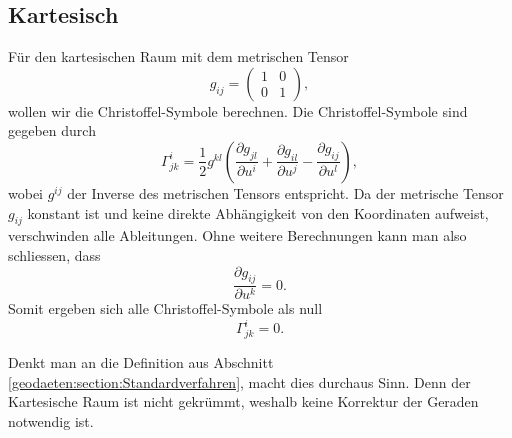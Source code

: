 %
%
%
%
\subsection{Kartesisch\label{geodaeten:section:Standardverfahren:Kartesisch}}

Für den kartesischen Raum mit dem metrischen Tensor
\begin{equation}
g_{ij} = \begin{pmatrix} 
	1 & 0 \\ 
	0 & 1 
\end{pmatrix},
\end{equation}
wollen wir die Christoffel-Symbole berechnen.
Die Christoffel-Symbole sind gegeben durch
\begin{equation}
\Gamma^i_{jk} = \frac{1}{2} g^{kl} \left( \frac{\partial g_{jl}}{\partial u^i} + \frac{\partial g_{il}}{\partial u^j} - \frac{\partial g_{ij}}{\partial u^l} \right),
\end{equation}
wobei $g^{ij}$ der Inverse des metrischen Tensors entspricht.
Da der metrische Tensor $g_{ij}$ konstant ist und keine direkte Abhängigkeit von den Koordinaten aufweist, verschwinden alle Ableitungen.
Ohne weitere Berechnungen kann man also schliessen, dass
\begin{equation}
\frac{\partial g_{ij}}{\partial u^k} = 0 .
\end{equation}
Somit ergeben sich alle Christoffel-Symbole als null
\begin{equation}
\Gamma^i_{jk} = 0 .
\end{equation}

Denkt man an die Definition aus Abschnitt \ref{geodaeten:section:Standardverfahren}, macht dies durchaus Sinn.
Denn der Kartesische Raum ist nicht gekrümmt, weshalb keine Korrektur der Geraden notwendig ist.

